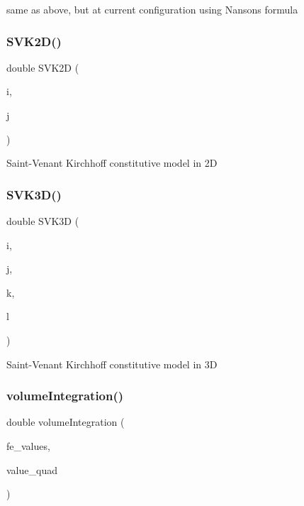 same as above, but at current configuration using Nanson\textquotesingle{}s formula \mbox{\label{class_residual_abd1627afa72ac735e6907067e1d47bb6}} 
\subsubsection{\texorpdfstring{SVK2D()}{SVK2D()}}
{\footnotesize\ttfamily double S\+V\+K2D (\begin{DoxyParamCaption}\item[{unsigned int}]{i,  }\item[{unsigned int}]{j }\end{DoxyParamCaption})}

Saint-\/\+Venant Kirchhoff constitutive model in 2D \mbox{\label{class_residual_a10e7144d5c4746f15a48d506830790cb}} 
\subsubsection{\texorpdfstring{SVK3D()}{SVK3D()}}
{\footnotesize\ttfamily double S\+V\+K3D (\begin{DoxyParamCaption}\item[{unsigned int}]{i,  }\item[{unsigned int}]{j,  }\item[{unsigned int}]{k,  }\item[{unsigned int}]{l }\end{DoxyParamCaption})}

Saint-\/\+Venant Kirchhoff constitutive model in 3D \mbox{\label{class_residual_a8ac0b75533aa9e599cc3c623e57fa5aa}} 
\subsubsection{\texorpdfstring{volumeIntegration()}{volumeIntegration()}\hspace{0.1cm}{\footnotesize\ttfamily [1/6]}}
{\footnotesize\ttfamily double volume\+Integration (\begin{DoxyParamCaption}\item[{const F\+E\+Values$<$ dim $>$ \&}]{fe\+\_\+values,  }\item[{double}]{value\+\_\+quad }\end{DoxyParamCaption})}

